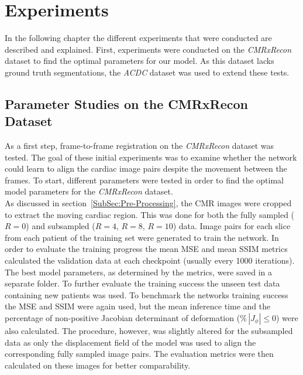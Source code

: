 \documentclass[english,version-2022-01]{uzl-thesis} %
\begin{document}
\chapter{Experiments} \label{Ch:Experiments}
In the following chapter the different experiments that were conducted are described and explained. 
First, experiments were conducted on the \emph{CMRxRecon} dataset to find the optimal parameters for our model. As this dataset lacks ground truth segmentations, the \emph{ACDC} dataset was used to extend these tests.


\section{Parameter Studies on the CMRxRecon Dataset} \label{Sec:ParameterStudies}
As a first step, frame-to-frame registration on the \emph{CMRxRecon} dataset was tested. The goal of these initial experiments was to examine whether the network could learn to align the cardiac image pairs despite the movement between the frames. To start, different parameters were tested in order to find the optimal model parameters for the \emph{CMRxRecon} dataset. 
\\
As discussed in section~\ref{SubSec:Pre-Processing}, the CMR images were cropped to extract the moving cardiac region. This was done for both the fully sampled ($R=0$) and subsampled ($R=4$, $R=8$, $R=10$) data. Image pairs for each slice from each patient of the training set were generated to train the network. In order to evaluate the training progress the mean MSE and mean SSIM metrics calculated the validation data at each checkpoint (usually every 1000 iterations). The best model parameters, as determined by the metrics, were saved in a separate folder. To further evaluate the training success the unseen test data containing new patients was used. To benchmark the networks training success the MSE and SSIM were again used, but the mean inference time and the percentage of non-positive Jacobian determinant of deformation ($\% \, |J_{\phi}|\leq0$) were also calculated. The procedure, however, was slightly altered for the subsampled data as only the displacement field of the model was used to align the corresponding fully sampled image pairs. The evaluation metrics were then calculated on these images for better comparability.
\end{document}
